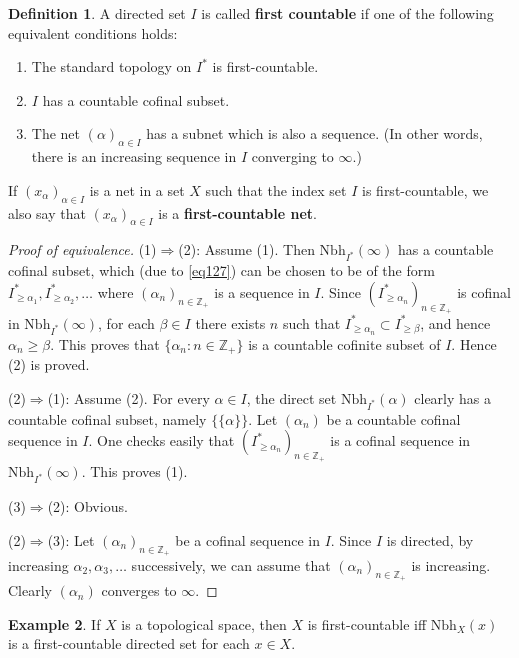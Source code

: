 \documentclass[12pt,b5paper,notitlepage]{article}
\theoremstyle{definition}
\newtheorem{df}{Definition}[subsection]
\newtheorem{eg}[df]{Example}
\theoremstyle{plain}
\newcommand{\Zbb}{\mathbb Z}
\newcommand{\Nbh}{\mathrm{Nbh}}
\numberwithin{equation}{section}
\begin{document}
\begin{df}
A directed set $I$ is called \textbf{first countable}  if one of the following equivalent conditions holds:
\begin{enumerate}[label=(\arabic*)]
\item The standard topology on $I^*$ is first-countable.
\item $I$ has a countable cofinal subset.
\item The net $(\alpha)_{\alpha\in I}$ has a subnet which is also a sequence. (In other words, there is an increasing sequence in $I$ converging to $\infty$.) 
\end{enumerate} 
If $(x_\alpha)_{\alpha\in I}$ is a net in a set $X$ such that the index set $I$ is first-countable, we also say that $(x_\alpha)_{\alpha\in I}$ is a \textbf{first-countable net}. 
\end{df}

\begin{proof}[Proof of equivalence]
(1)$\Rightarrow$(2): Assume (1). Then $\Nbh_{I^*}(\infty)$ has a countable cofinal subset, which (due to \eqref{eq127}) can be chosen to be of the form $I_{\geq\alpha_1}^*,I_{\geq\alpha_2}^*,\dots$ where $(\alpha_n)_{n\in\Zbb_+}$ is a sequence in $I$. Since $(I_{\geq\alpha_n}^*)_{n\in\Zbb_+}$ is cofinal in $\Nbh_{I^*}(\infty)$, for each $\beta\in I$ there exists $n$ such that $I_{\geq\alpha_n}^*\subset I_{\geq\beta}^*$, and hence $\alpha_n\geq\beta$. This proves that $\{\alpha_n:n\in\Zbb_+\}$ is a countable cofinite subset of $I$. Hence (2) is proved.

(2)$\Rightarrow$(1): Assume (2). For every $\alpha\in I$, the direct set $\Nbh_{I^*}(\alpha)$ clearly has a countable cofinal subset, namely $\{\{\alpha\}\}$. Let $(\alpha_n)$ be a countable cofinal sequence in $I$. One checks easily that $(I_{\geq\alpha_n}^*)_{n\in\Zbb_+}$ is a cofinal sequence in $\Nbh_{I^*}(\infty)$. This proves (1).

(3)$\Rightarrow$(2): Obvious.

(2)$\Rightarrow$(3): Let $(\alpha_n)_{n\in\Zbb_+}$ be a cofinal sequence in $I$. Since $I$ is directed, by increasing $\alpha_2,\alpha_3,\dots$ successively, we can assume that $(\alpha_n)_{n\in\Zbb_+}$ is increasing. Clearly $(\alpha_n)$ converges to $\infty$.
\end{proof}


\begin{eg}
If $X$ is a topological space, then $X$ is first-countable iff $\Nbh_X(x)$ is a first-countable directed set for each $x\in X$.
\end{eg}
\end{document}
